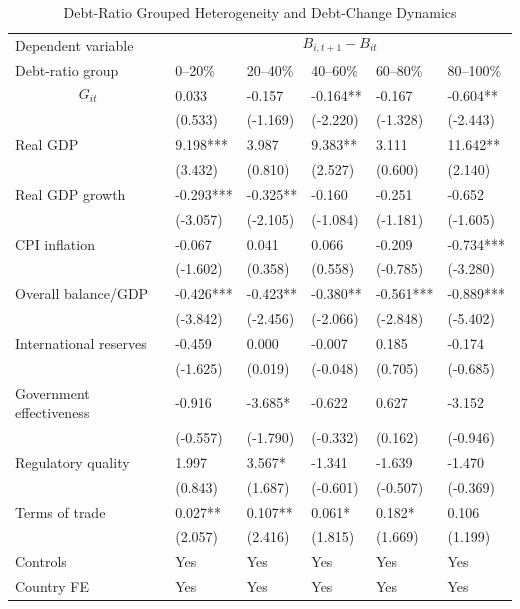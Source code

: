 \begin{table}[H]\centering
\begin{threeparttable}
\caption{Debt-Ratio Grouped Heterogeneity and Debt-Change Dynamics}
\label{tab:B_group_heterogeneity_debt}
\scriptsize
\begin{tabularx}{\textwidth}{lYYYYY}
\toprule
Dependent variable &  \\
\cmidrule(lr){2-6}
Debt-ratio group & 0--20\% & 20--40\% & 40--60\% & 60--80\% & 80--100\% \\
\midrule
$$G_{it}$$ & 0.033 & -0.157 & -0.164** & -0.167 & -0.604** \\
  & (0.533) & (-1.169) & (-2.220) & (-1.328) & (-2.443) \\
Real GDP & 9.198*** & 3.987 & 9.383** & 3.111 & 11.642** \\
  & (3.432) & (0.810) & (2.527) & (0.600) & (2.140) \\
Real GDP growth & -0.293*** & -0.325** & -0.160 & -0.251 & -0.652 \\
  & (-3.057) & (-2.105) & (-1.084) & (-1.181) & (-1.605) \\
CPI inflation & -0.067 & 0.041 & 0.066 & -0.209 & -0.734*** \\
  & (-1.602) & (0.358) & (0.558) & (-0.785) & (-3.280) \\
Overall balance/GDP & -0.426*** & -0.423** & -0.380** & -0.561*** & -0.889*** \\
  & (-3.842) & (-2.456) & (-2.066) & (-2.848) & (-5.402) \\
International reserves & -0.459 & 0.000 & -0.007 & 0.185 & -0.174 \\
  & (-1.625) & (0.019) & (-0.048) & (0.705) & (-0.685) \\
Government effectiveness & -0.916 & -3.685* & -0.622 & 0.627 & -3.152 \\
  & (-0.557) & (-1.790) & (-0.332) & (0.162) & (-0.946) \\
Regulatory quality & 1.997 & 3.567* & -1.341 & -1.639 & -1.470 \\
  & (0.843) & (1.687) & (-0.601) & (-0.507) & (-0.369) \\
Terms of trade & 0.027** & 0.107** & 0.061* & 0.182* & 0.106 \\
  & (2.057) & (2.416) & (1.815) & (1.669) & (1.199) \\
\midrule
Controls & Yes & Yes & Yes & Yes & Yes \\
Country FE & Yes & Yes & Yes & Yes & Yes \\

\end{tabularx}
\end{threeparttable}
\end{table}
